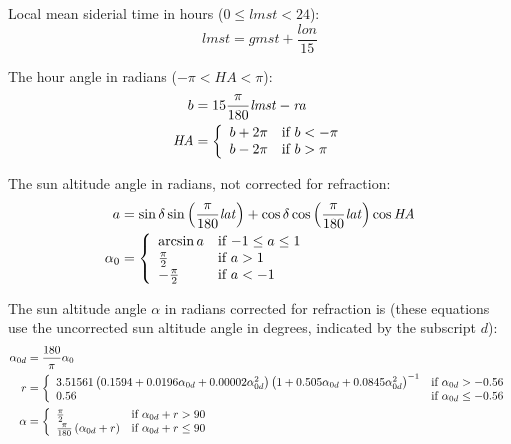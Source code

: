 \documentclass[12pt,letterpaper]{article}
\begin{document}
Local mean siderial time in hours ($0\leq\mathit{lmst}<24$):
\begin{equation}
\mathit{lmst}= \mathit{gmst} + \frac{\mathit{lon}}{15}
\end{equation}

The hour angle in radians ($-\pi<\mathit{HA}<\pi$):
\begin{align}
b &= 15\frac{\pi}{180}\mathit{lmst} -\mathit{ra}\notag\\
\mathit{HA}&= \left\{
  \begin{array}{ll}
  b + 2\pi & \text{if $b<-\pi$}\\
  b - 2\pi & \text{if $b>\pi$}
  \end{array}
\right.
\end{align}

The sun altitude angle in radians, not corrected for refraction:
\begin{align} \label{eqn-elv}
a &= \sin\delta \sin\left(\frac{\pi}{180}\mathit{lat}\right) + \cos\delta \cos\left(\frac{\pi}{180}\mathit{lat}\right) \cos\mathit{HA}\notag\\
\alpha_0 &=\left\{
  \begin{array}{ll}
    \arcsin a & \text{if $-1 \leq a \leq 1$}\\
    \frac{\pi}{2} & \text{if $a>1$}\\
    -\frac{\pi}{2} & \text{if $a<-1$}
  \end{array}
\right.
\end{align}

The sun altitude angle $\alpha$ in radians corrected for refraction is (these equations use the uncorrected sun altitude angle in degrees, indicated by the subscript $d$):
\begin{align}\label{eqn-elvcorr}
\alpha_{0d} &= \frac{180}{\pi}\alpha_0\notag\\
r &= \left\{
\begin{array}{ll}
3.51561\left(0.1594 + 0.0196\alpha_{0d} + 0.00002\alpha_{0d}^2\right) \left(1 + 0.505\alpha_{0d} + 0.0845\alpha_{0d}^2\right)^{-1} & \text{if $\alpha_{0d}>-0.56$}\\
0.56 & \text{if $\alpha_{0d} \leq -0.56$}
\end{array}
\right.\notag\\
\alpha & = \left\{
\begin{array}{ll}
\frac{\pi}{2} & \text{if $\alpha_{0d} + r > 90$}\\
\frac{\pi}{180}\left(\alpha_{0d} + r\right) & \text{if $\alpha_{0d} + r \leq 90$}
\end{array}
\right.
\end{align}
\end{document}
